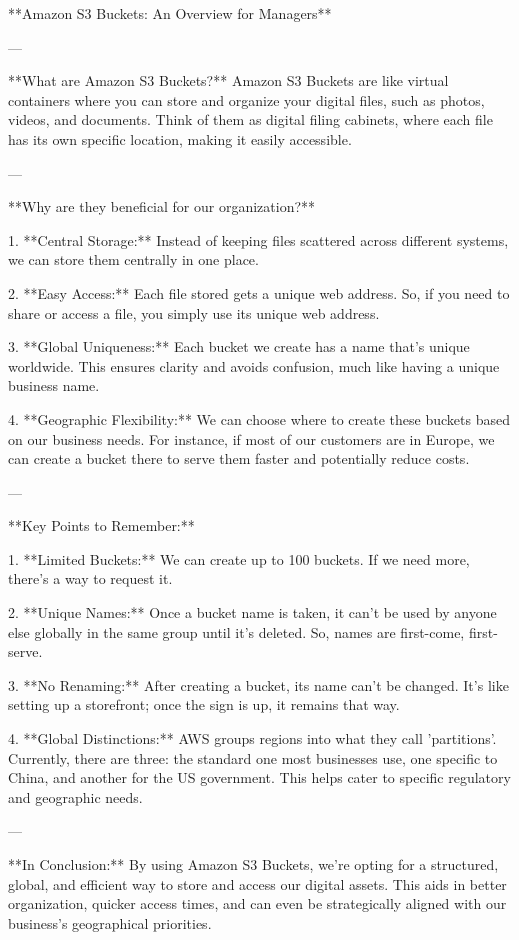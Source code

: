 **Amazon S3 Buckets: An Overview for Managers**

---

**What are Amazon S3 Buckets?**
Amazon S3 Buckets are like virtual containers where you can store and organize your digital files, such as photos, videos, and documents. Think of them as digital filing cabinets, where each file has its own specific location, making it easily accessible.

---

**Why are they beneficial for our organization?**

1. **Central Storage:** Instead of keeping files scattered across different systems, we can store them centrally in one place.
   
2. **Easy Access:** Each file stored gets a unique web address. So, if you need to share or access a file, you simply use its unique web address.
   
3. **Global Uniqueness:** Each bucket we create has a name that's unique worldwide. This ensures clarity and avoids confusion, much like having a unique business name.
   
4. **Geographic Flexibility:** We can choose where to create these buckets based on our business needs. For instance, if most of our customers are in Europe, we can create a bucket there to serve them faster and potentially reduce costs.

---

**Key Points to Remember:**

1. **Limited Buckets:** We can create up to 100 buckets. If we need more, there's a way to request it.
   
2. **Unique Names:** Once a bucket name is taken, it can't be used by anyone else globally in the same group until it's deleted. So, names are first-come, first-serve.
   
3. **No Renaming:** After creating a bucket, its name can't be changed. It's like setting up a storefront; once the sign is up, it remains that way.

4. **Global Distinctions:** AWS groups regions into what they call 'partitions'. Currently, there are three: the standard one most businesses use, one specific to China, and another for the US government. This helps cater to specific regulatory and geographic needs.

---

**In Conclusion:**
By using Amazon S3 Buckets, we're opting for a structured, global, and efficient way to store and access our digital assets. This aids in better organization, quicker access times, and can even be strategically aligned with our business's geographical priorities.